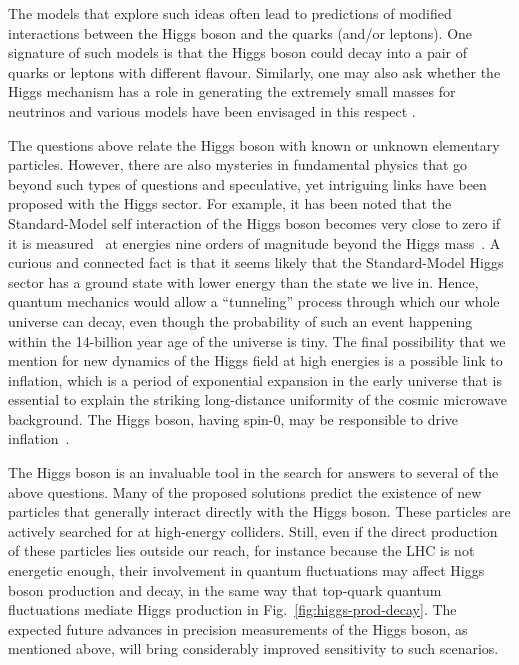 \documentclass[12pt]{article}
\begin{document}
The models that explore such ideas often lead to predictions of
modified interactions between the Higgs boson and the quarks (and/or
leptons). One signature of such models is that the Higgs boson could
decay into a pair of quarks or leptons with different flavour.
%
Similarly, one may also ask whether the Higgs mechanism has a role in generating
the extremely small masses for neutrinos and various models have been
envisaged in this respect \cite{deGouvea:2016qpx}.

The questions above relate the Higgs boson with known or unknown
elementary particles.
%
However, there are also mysteries in fundamental physics that go beyond
such types of questions and speculative, yet intriguing links have been
proposed with the Higgs sector.
%
For example, it has been noted that 
% 
the Standard-Model self interaction of the Higgs boson becomes very
close to zero if it is measured~\cite{Cabibbo:1979ay,Hung:1979dn,Lindner:1985uk} 
at energies nine orders of magnitude beyond the Higgs
mass~\cite{Degrassi:2012ry,Buttazzo:2013uya}. 
%
A curious and connected fact 
is that it seems likely that the Standard-Model Higgs
sector has a ground state with lower energy than the state we live in.
%
Hence, quantum mechanics would allow a ``tunneling'' process through
which our whole universe can decay, even though the probability of
such an event happening within the 14-billion year age of the universe
is tiny.
%
The final possibility that we mention for new dynamics of the Higgs
field at high energies is a possible link to inflation, which is a
period of exponential expansion in the early universe that is
essential to explain the striking long-distance uniformity of the
cosmic microwave background. The Higgs boson, having spin-0,
may be responsible to drive inflation~\cite{Bezrukov:2007ep}.

The Higgs boson is an invaluable tool in the search for answers to
several of the above questions.
%
Many of the proposed solutions predict the existence of new particles
that generally interact directly with the Higgs boson. These particles
are actively searched for at high-energy colliders. 
%
Still, even if the direct production of these particles lies outside our reach, for instance because the LHC is not energetic enough, their
involvement in quantum fluctuations may affect Higgs boson
production and decay, in the same way that top-quark quantum fluctuations
mediate Higgs production in Fig.~\ref{fig:higgs-prod-decay}.
%
The expected future advances in precision measurements of the Higgs
boson, as mentioned above, will bring considerably improved
sensitivity to such scenarios.
\end{document}
